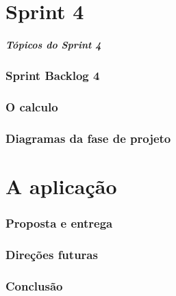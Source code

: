 \documentclass[12pt,a4paper]{beamer}
\begin{document}
	\part{Sprint 4}
		
		\begin{frame}
			\frametitle{Tópicos do Sprint 4}
			\tableofcontents[pausesections]
		\end{frame}	
 		\section{Sprint Backlog 4}
		\section{O calculo}
		\section{Diagramas da fase de projeto}
	\part{A aplicação}
		\section{Proposta e entrega}
		\section{Direções futuras}
		\section{Conclusão}
\end{document}

